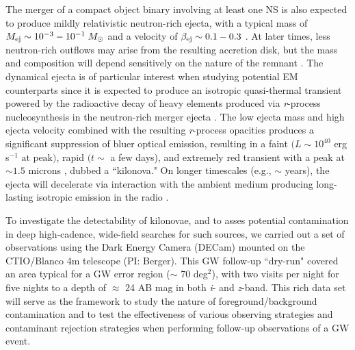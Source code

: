 The merger of a compact object binary involving at least one NS is also expected to produce mildly relativistic neutron-rich ejecta, with a typical mass of $M_{{\rm ej}} \sim 10^{-3}-10^{-1}\; M_{\odot}$ and a velocity of $\beta_{{\rm ej}} \sim 0.1-0.3$ \citep[see e.g.,][]{Rosswog+99,Rosswog2005,Bauswein+13a}. At later times, less neutron-rich outflows may arise from the resulting accretion disk, but the mass and composition will depend sensitively on the nature of the remnant \citep[see e.g.,][]{Metzger+09a,Dessart+09,FernandezMetzger13,Fernandez+15}. The dynamical ejecta is of particular interest when studying potential EM counterparts since it is expected to produce an isotropic quasi-thermal transient powered by the radioactive decay of heavy elements produced via {\em r}-process nucleosynthesis in the neutron-rich merger ejecta \citep{LP98,Rosswog2005,Metzger+10,Grossman+14,Tanaka+14}. The low ejecta mass and high ejecta velocity combined with the resulting {\em r}-process opacities \citep[$\kappa \sim 10-100 \; \text{cm}^2 \text{ g}^{-1} \text{ for } \lambda \sim 0.3 - 3\; \mu\text{m}$,][]{Kasen+13} produces a significant suppression of bluer optical emission, resulting in a faint $(L \sim 10^{40}$ erg s$^{-1} \text{ at peak})$, rapid $(t \sim$ a few days), and extremely red transient with a peak at $\sim1.5$ microns \citep[see e.g.,][]{Kasen+13,BarnesKasen13,TanakaHotokezaka13}, dubbed a ``kilonova." On longer timescales (e.g., $\sim$ years), the ejecta will decelerate via interaction with the ambient medium producing long-lasting isotropic emission in the radio \citep{NakarPiran11}.

To investigate the detectability of kilonovae, and to asses potential contamination in deep high-cadence, wide-field searches for such sources, we carried out a set of observations using the Dark Energy Camera (DECam) mounted on the CTIO/Blanco 4m telescope (PI: Berger). This GW follow-up ``dry-run" covered an area typical for a GW error region ($\sim$ 70 deg$^2$), with two visits per night for five nights to a depth of $\approx$ 24 AB mag in both {\em i}- and {\em z}-band. This rich data set will serve as the framework to study the nature of foreground/background contamination and to test the effectiveness of various observing strategies and contaminant rejection strategies when performing follow-up observations of a GW event.

